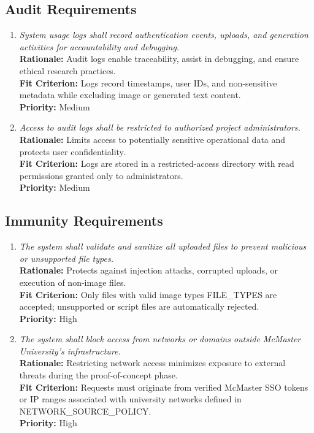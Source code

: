 \documentclass[12pt]{article}
\begin{document}
\subsection{Audit Requirements}
\begin{enumerate}[label=SR-AU \arabic*., wide=0pt, leftmargin=*]
\item \emph{System usage logs shall record authentication events, uploads, and generation activities for accountability and debugging.}\\[2mm] 
    {\bf Rationale:} Audit logs enable traceability, assist in debugging, and ensure ethical research practices.\\
    {\bf Fit Criterion:} Logs record timestamps, user IDs, and non-sensitive metadata while excluding image or generated text content.\\
    {\bf Priority:} Medium

\item \emph{Access to audit logs shall be restricted to authorized project administrators.}\\[2mm] 
    {\bf Rationale:} Limits access to potentially sensitive operational data and protects user confidentiality.\\
    {\bf Fit Criterion:} Logs are stored in a restricted-access directory with read permissions granted only to administrators.\\
    {\bf Priority:} Medium
\end{enumerate}

\subsection{Immunity Requirements}
\begin{enumerate}[label=SR-IM \arabic*., wide=0pt, leftmargin=*]
\item \emph{The system shall validate and sanitize all uploaded files to prevent malicious or unsupported file types.}\\[2mm] 
    {\bf Rationale:} Protects against injection attacks, corrupted uploads, or execution of non-image files.\\
    {\bf Fit Criterion:} Only files with valid image types FILE\_TYPES are accepted; unsupported or script files are automatically rejected.\\
    {\bf Priority:} High

\item \emph{The system shall block access from networks or domains outside McMaster University’s infrastructure.}\\[2mm] 
    {\bf Rationale:} Restricting network access minimizes exposure to external threats during the proof-of-concept phase.\\
    {\bf Fit Criterion:} Requests must originate from verified McMaster SSO tokens or IP ranges associated with university networks defined in NETWORK\_SOURCE\_POLICY.\\
    {\bf Priority:} High
\end{enumerate}
\end{document}
